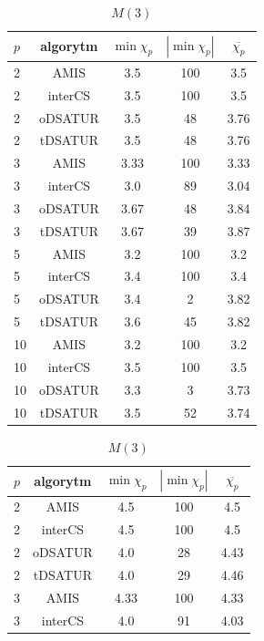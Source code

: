\documentclass[10pt,a4paper]{article}
\begin{document}
	\begin{table}[H]
		\begin{minipage}{.5\linewidth}
			\centering
			\begin{tabular}{|l|c|c|c|c|}
				\hline
				\textbf{$p$} & \textbf{algorytm} & \textbf{$\min \chi_{p}$} & \textbf{$|\min \chi_{p}|$} & \textbf{$\overline{\chi_{p}}$} \\
				\hline
				2 & AMIS & 3.5 & 100 & 3.5 \\
				2 & interCS & 3.5 & 100 & 3.5 \\
				2 & oDSATUR & 3.5 & 48 & 3.76 \\
				2 & tDSATUR & 3.5 & 48 & 3.76 \\
				\hline
				3 & AMIS & 3.33 & 100 & 3.33 \\
				3 & interCS & 3.0 & 89 & 3.04 \\
				3 & oDSATUR & 3.67 & 48 & 3.84 \\
				3 & tDSATUR & 3.67 & 39 & 3.87 \\
				\hline
				5 & AMIS & 3.2 & 100 & 3.2 \\
				5 & interCS & 3.4 & 100 & 3.4 \\
				5 & oDSATUR & 3.4 & 2 & 3.82 \\
				5 & tDSATUR & 3.6 & 45 & 3.82 \\
				\hline
				10 & AMIS & 3.2 & 100 & 3.2 \\
				10 & interCS & 3.5 & 100 & 3.5 \\
				10 & oDSATUR & 3.3 & 3 & 3.73 \\
				10 & tDSATUR & 3.5 & 52 & 3.74 \\
				\hline
			\end{tabular}
			\caption{$M(3)$}
		\end{minipage}
		\begin{minipage}{.5\linewidth}
			\centering
			\begin{tabular}{|l|c|c|c|c|}
				\hline
				\textbf{$p$} & \textbf{algorytm} & \textbf{$\min \chi_{p}$} & \textbf{$|\min \chi_{p}|$} & \textbf{$\overline{\chi_{p}}$} \\
				\hline
				2 & AMIS & 4.5 & 100 & 4.5 \\
				2 & interCS & 4.5 & 100 & 4.5 \\
				2 & oDSATUR & 4.0 & 28 & 4.43 \\
				2 & tDSATUR & 4.0 & 29 & 4.46 \\
				\hline
				3 & AMIS & 4.33 & 100 & 4.33 \\
				3 & interCS & 4.0 & 91 & 4.03 \\

\end{tabular}
\end{minipage}
\end{table}
\end{document}
